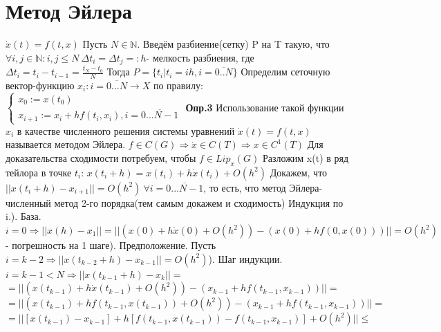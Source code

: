 \documentclass[a4paper,14pt]{article}
\begin{document}
\section{Метод Эйлера}
$\dot{x}(t)=f(t,x)$\newline
\indent Пусть $N\in \mathbb{N}$. Введём разбиение(сетку) P на T такую, что $\forall i,j \in \mathbb{N}:i,j\leq N \ \Delta t_i=\Delta t_j =:h$- мелкость разбиения,
где $\Delta t_i=t_i-t_{i-1}=\frac{t_N-t_0}{N}$\newline
Тогда $P=\{t_i|t_i=ih,i=\overline{0..N}\}$\newline
Определим сеточную вектор-функцию $x_i:i=\overline{0...N}\rightarrow X$ по правилу:\newline
$
\begin{cases}
  x_0:=x(t_0) \\
  x_{i+1}:=x_i+hf(t_i,x_i), i=\overline{0...N-1}
\end{cases}
$\newline
\textbf{Опр.3} Использование такой функции $x_i$ в качестве численного решения системы уравнений\newline
$\dot{x}(t)=f(t,x)$ называется методом Эйлера.\newline
$f\in C(G) \Rightarrow \dot{x} \in C(T) \Rightarrow x \in C^1(T)$\newline
Для доказательства сходимости потребуем, чтобы $f \in Lip_x(G)$\newline
Разложим x(t) в ряд тейлора в точке $t_i$: $x(t_i+h)=x(t_i)+h\dot{x}(t_i)+O(h^2)$\newline
Докажем, что $||x(t_i+h)-x_{i+1}||=O(h^2) \ \forall i=\overline{0...N-1}$, то есть, что метод Эйлера- численный метод 2-го порядка(тем самым докажем и сходимость)\newline
Индукция по i.). База. $i=0\Rightarrow ||x(h)-x_{1}||=||(x(0)+h\dot{x}(0)+O(h^2))-(x(0)+hf(0,x(0)))||=O(h^2)$- погрешность на 1 шаге). Предположение. Пусть $i=k-2\Rightarrow ||x(t_{k-2}+h)-x_{k-1}||=O(h^2)$). Шаг индукции. $i=k-1<N \Rightarrow ||x(t_{k-1}+h)-x_{k}||=$\newline
$=||(x(t_{k-1})+h\dot{x}(t_{k-1})+O(h^2))-(x_{k-1}+hf(t_{k-1},x_{k-1}))||=$\newline
$=||(x(t_{k-1})+hf(t_{k-1},x(t_{k-1}))+O(h^2))-(x_{k-1}+hf(t_{k-1},x_{k-1}))||=$\newline
$=||[x(t_{k-1})-x_{k-1}]+h[f(t_{k-1},x(t_{k-1}))-f(t_{k-1},x_{k-1})]+O(h^2)||\leq$\newline
\end{document}
